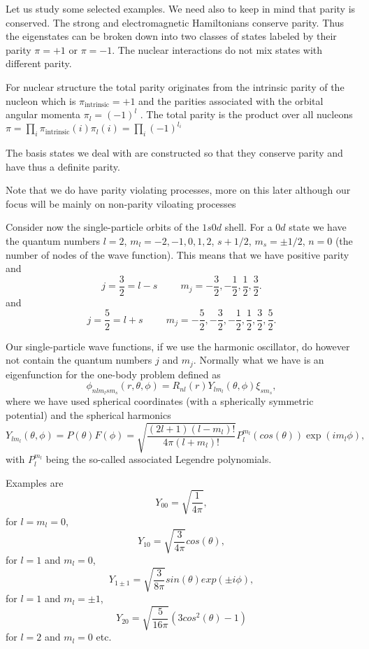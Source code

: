 \documentclass[graybox,sectrefs,envcountresetchap,open=right]{svmonodo}
\begin{document}
Let us study some selected examples. We need also to keep in mind that parity is conserved.
The strong and electromagnetic Hamiltonians conserve parity. Thus the eigenstates can be
broken down into two classes of states labeled by their parity $\pi= +1$ or $\pi=-1$.
The nuclear interactions do not mix states with different parity.

For nuclear structure the total parity originates
from the intrinsic parity of the nucleon which is $\pi_{\mathrm{intrinsic}}=+1$ 
and the parities associated with
the orbital angular momenta $\pi_l=(-1)^l$ . The total parity is the product over all nucleons
$\pi = \prod_i \pi_{\mathrm{intrinsic}}(i)\pi_l(i) = \prod_i (-1)^{l_i}$

The basis states we deal with are constructed so that they conserve parity and have thus a definite parity. 

Note that we do have parity violating processes, more on this later although our focus will be mainly on non-parity viloating processes

Consider now the single-particle orbits of the $1s0d$ shell. 
For a $0d$ state we have the quantum numbers $l=2$, $m_l=-2,-1,0,1,2$, $s+1/2$, $m_s=\pm 1/2$,
$n=0$ (the number of nodes of the wave function).   This means that we have positive parity and
\[
j=\frac{3}{2}=l-s\hspace{1cm} m_j=-\frac{3}{2},-\frac{1}{2},\frac{1}{2},\frac{3}{2}.
\]
and
\[
j=\frac{5}{2}=l+s\hspace{1cm} m_j=-\frac{5}{2},-\frac{3}{2},-\frac{1}{2},\frac{1}{2},\frac{3}{2},\frac{5}{2}.
\]

Our single-particle wave functions, if we use the harmonic oscillator, do however not contain the quantum numbers $j$ and $m_j$.
Normally what we have is an eigenfunction for the one-body problem defined as
\[
\phi_{nlm_lsm_s}(r,\theta,\phi)=R_{nl}(r)Y_{lm_l}(\theta,\phi)\xi_{sm_s},
\]
where we have used spherical coordinates (with a spherically symmetric potential) and the spherical harmonics
\[
    Y_{lm_l}(\theta,\phi)=P(\theta)F(\phi)=\sqrt{\frac{(2l+1)(l-m_l)!}{4\pi (l+m_l)!}}
                      P_l^{m_l}(cos(\theta))\exp{(im_l\phi)},
\]
with $P_l^{m_l}$ being the so-called associated Legendre polynomials. 

Examples are
\[
   Y_{00}=\sqrt{\frac{1}{4\pi}},
\]
for $l=m_l=0$, 
\[
   Y_{10}=\sqrt{\frac{3}{4\pi}}cos(\theta),
\]
for $l=1$ and $m_l=0$, 
\[
   Y_{1\pm 1}=\sqrt{\frac{3}{8\pi}}sin(\theta)exp(\pm i\phi),
\]
for  $l=1$ and $m_l=\pm 1$, 
\[
   Y_{20}=\sqrt{\frac{5}{16\pi}}(3cos^2(\theta)-1)
\]
for $l=2$ and $m_l=0$ etc. 
\end{document}
